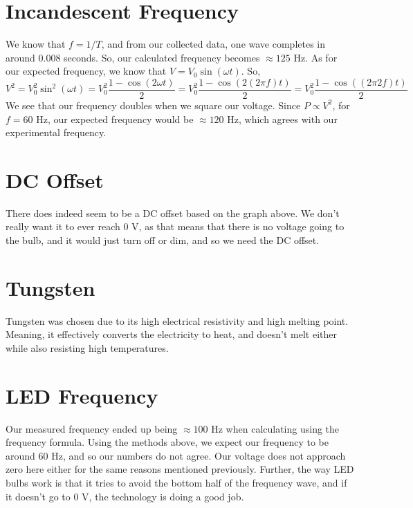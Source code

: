 \documentclass[12pt]{article}
\begin{document}
\section{Incandescent Frequency}

We know that $f = 1/T$, and from our collected data, one wave completes in around $0.008$ seconds.
So, our calculated frequency becomes $\approx 125$ Hz. As for our expected frequency, we know that $V = V_0 \sin (\omega t)$.
So,
\begin{equation*}
    V^2 = V_0^2 \sin^2(\omega t) = V_0^2 \frac{1 - \cos (2 \omega t)}{2} = V_0^2 \frac{1 - \cos (2 (2 \pi f) t)}{2} = V_0^2 \frac{1 - \cos ((2 \pi 2f) t)}{2}
\end{equation*}
We see that our frequency doubles when we square our voltage. Since $P \propto V^2$, for $f = 60$ Hz, our expected
frequency would be $\approx 120$ Hz, which agrees with our experimental frequency.
\section{DC Offset}

There does indeed seem to be a DC offset based on the graph above. We don't really want it to ever reach 0 V, as that means
that there is no voltage going to the bulb, and it would just turn off or dim, and so we need the DC offset.

\section{Tungsten}

Tungsten was chosen due to its high electrical resistivity and high melting point. Meaning, it 
effectively converts the electricity to heat, and doesn't melt either while also resisting high temperatures.

\section{LED Frequency}

Our measured frequency ended up being $\approx 100$ Hz when calculating using the frequency formula. Using the methods above,
we expect our frequency to be around 60 Hz, and so our numbers do not agree. Our voltage does not approach zero here either for the same reasons mentioned previously.
Further, the way LED bulbs work is that it tries to avoid the bottom half of the frequency wave, and if it doesn't go to 0 V,
the technology is doing a good job.
\end{document}
